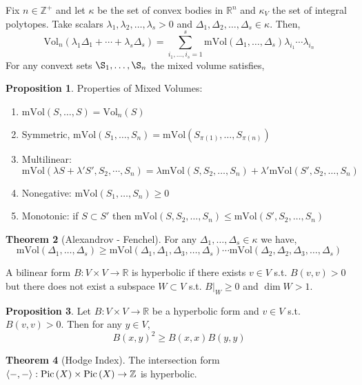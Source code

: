 \documentclass[12pt]{extarticle}
\newcommand{\Z}{\mathbb{Z}}
\newcommand{\R}{\mathbb{R}}
\theoremstyle{definition}
\newtheorem{theorem}{Theorem}[section]
\newtheorem{proposition}[theorem]{Proposition}
\newenvironment{definition}[1][Definition:]{\begin{trivlist}
\item[\hskip \labelsep {\bfseries #1}]}{\end{trivlist}}
\newcommand{\Vol}[2]{\mathrm{Vol}_{#1}\left( #2 \right)}
\newcommand{\mVol}[1]{\mathrm{mVol}\left( #1 \right)}
\newcommand{\inner}[2]{\left< #1, #2 \right>}
\begin{document}
Fix $n \in \Z^{+}$ and let $\kappa$ be the set of convex bodies in $\R^n$ and $\kappa_V$ the set of integral polytopes. Take scalars $\lambda_1, \lambda_2, \dots, \lambda_s > 0$ and $\Delta_1, \Delta_2, \dots, \Delta_s \in \kappa$. Then,
\[ \Vol{n}{\lambda_1 \Delta_1 + \cdots + \lambda_s \Delta_s} = \sum_{i_1, \dots, i_s = 1}^s \mVol{\Delta_1, \dots, \Delta_s} \lambda_{i_1} \cdots \lambda_{i_n} \]
For any convext sets $\S_1, \dots, \S_n$ the mixed volume satisfies,
\begin{proposition}
Properties of Mixed Volumes:
\begin{enumerate}
\item $\mVol{S, \dots, S} = \Vol{n}{S}$
\item Symmetric, $\mVol{S_1, \dots, S_n} = \mVol{S_{\pi(1)}, \dots, S_{\pi(n)}}$
\item Multilinear: $\mVol{\lambda S + \lambda' S', S_2, \cdots, S_n} = \lambda \mVol{S, S_2, \dots, S_n} + \lambda' \mVol{S', S_2, \dots, S_n}$
\item Nonegative: $\mVol{S_1, \dots, S_n} \ge 0$
\item Monotonic: if $S \subset S'$ then $\mVol{S, S_2, \dots, S_n} \le \mVol{S', S_2, \dots, S_n}$
\end{enumerate}
\end{proposition}

\begin{theorem}[Alexandrov - Fenchel]
For any $\Delta_1, \dots, \Delta_s \in \kappa$ we have,
\[ \mVol{\Delta_1, \dots, \Delta_s} \ge \mVol{\Delta_1, \Delta_1, \Delta_3, \dots, \Delta_s} \cdots \mVol{\Delta_2, \Delta_2, \Delta_3, \dots, \Delta_s} \]
\end{theorem}

\begin{definition}
A bilinear form $B : V \times V \to \R$ is hyperbolic if there exists $v \in V$ s.t. $B(v,v) > 0$ but there does not exist a subspace $W \subset V$ s.t. $B|_W \ge 0$ and $\dim{W} > 1$.
\end{definition}

\begin{proposition}
Let $B : V \times V \to \R$ be a hyperbolic form and $v \in V$ s.t. $B(v, v) > 0$. Then for any $y \in V$,
\[ B(x,y)^2 \ge B(x,x) B(y,y) \]
\end{proposition}

\begin{theorem}[Hodge Index]
The intersection form $\inner{-}{-} : \Pic{X} \times \Pic{X} \to \Z$ is hyperbolic.
\end{theorem}
\end{document}
